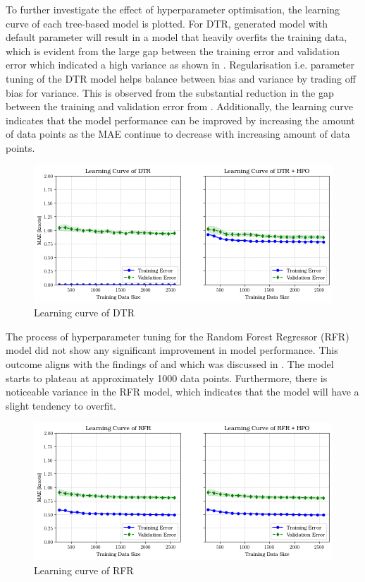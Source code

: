 To further investigate the effect of hyperparameter optimisation, the learning curve of each tree-based model is plotted. For DTR, generated model with default parameter will result in a model that heavily overfits the training data, which is evident from the large gap between the training error and validation error which indicated a high variance as shown in . Regularisation i.e. parameter tuning of the DTR model helps balance between bias and variance by trading off bias for variance. This is observed from the substantial reduction in the gap between the training and validation error from . Additionally, the learning curve indicates that the model performance can be improved by increasing the amount of data points as the MAE continue to decrease with increasing amount of data points.\\

\begin{figure}[h]
    \centering
        \includegraphics[width=.95\textwidth]{02_figures/learning_curve_dtr_mae.png}
        \caption{Learning curve of DTR}
        \label{fig:learn_curve_DTR_MAE}
\end{figure}

The process of hyperparameter tuning for the Random Forest Regressor (RFR) model did not show any significant improvement in model performance. This outcome aligns with the findings of   and  which was discussed in . The model starts to plateau at approximately 1000 data points. Furthermore, there is noticeable variance in the RFR model, which indicates that the model will have a slight tendency to overfit.\\

\begin{figure}[h]
    \centering
        \includegraphics[width=.95\textwidth]{02_figures/learning_curve_rfr_mae.png}
        \caption{Learning curve of RFR}
        \label{fig:learn_curve_RFR_MAE}
\end{figure}

